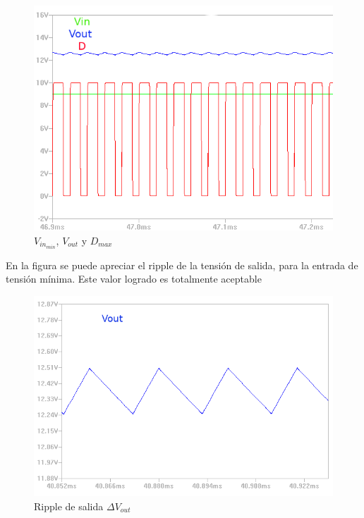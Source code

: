     \begin{figure}[htbp]
            \centering
             \includegraphics[scale = 0.3]{Figuras/Curvas_Vin9V.png}
            \caption{$V_{in_{min}}$, $V_{out}$ y $D_{max}$}
            \label{fig:Curvas Vin9V}
      \end{figure}
    
    En la figura se puede apreciar el ripple de la tensión de salida, para la entrada de tensión mínima. Este valor logrado es totalmente aceptable
    
    \begin{figure}[htbp]
            \centering
             \includegraphics[scale = 0.3]{Figuras/rippleVin9.png}
            \caption{ Ripple de salida $\Delta V_{out}$ }
            \label{fig: Ripple de salida}
      \end{figure}
    
